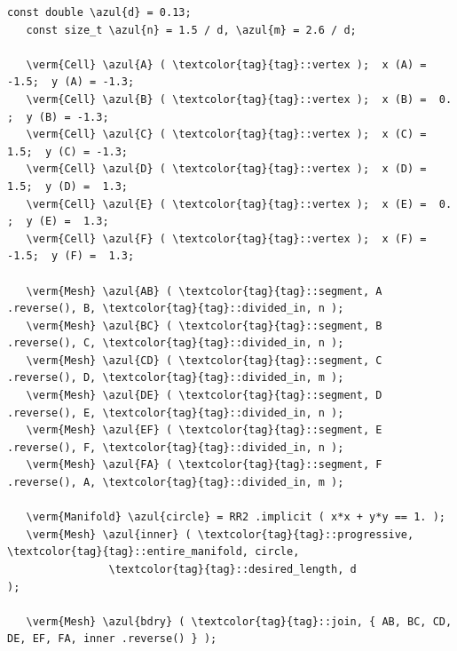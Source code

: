 \begin{Verbatim}[commandchars=\\\{\},formatcom=\small\tt,frame=single,
   label=parag-\ref{\numb section 7.\numb parag 18}.cpp,rulecolor=\color{coment},
   baselinestretch=0.94,framesep=2mm                                             ]
   const double \azul{d} = 0.13;
   const size_t \azul{n} = 1.5 / d, \azul{m} = 2.6 / d;

   \verm{Cell} \azul{A} ( \textcolor{tag}{tag}::vertex );  x (A) = -1.5;  y (A) = -1.3;
   \verm{Cell} \azul{B} ( \textcolor{tag}{tag}::vertex );  x (B) =  0. ;  y (B) = -1.3;
   \verm{Cell} \azul{C} ( \textcolor{tag}{tag}::vertex );  x (C) =  1.5;  y (C) = -1.3;
   \verm{Cell} \azul{D} ( \textcolor{tag}{tag}::vertex );  x (D) =  1.5;  y (D) =  1.3;
   \verm{Cell} \azul{E} ( \textcolor{tag}{tag}::vertex );  x (E) =  0. ;  y (E) =  1.3;
   \verm{Cell} \azul{F} ( \textcolor{tag}{tag}::vertex );  x (F) = -1.5;  y (F) =  1.3;

   \verm{Mesh} \azul{AB} ( \textcolor{tag}{tag}::segment, A .reverse(), B, \textcolor{tag}{tag}::divided_in, n );
   \verm{Mesh} \azul{BC} ( \textcolor{tag}{tag}::segment, B .reverse(), C, \textcolor{tag}{tag}::divided_in, n );
   \verm{Mesh} \azul{CD} ( \textcolor{tag}{tag}::segment, C .reverse(), D, \textcolor{tag}{tag}::divided_in, m );
   \verm{Mesh} \azul{DE} ( \textcolor{tag}{tag}::segment, D .reverse(), E, \textcolor{tag}{tag}::divided_in, n );
   \verm{Mesh} \azul{EF} ( \textcolor{tag}{tag}::segment, E .reverse(), F, \textcolor{tag}{tag}::divided_in, n );
   \verm{Mesh} \azul{FA} ( \textcolor{tag}{tag}::segment, F .reverse(), A, \textcolor{tag}{tag}::divided_in, m );

   \verm{Manifold} \azul{circle} = RR2 .implicit ( x*x + y*y == 1. );
   \verm{Mesh} \azul{inner} ( \textcolor{tag}{tag}::progressive, \textcolor{tag}{tag}::entire_manifold, circle,
                \textcolor{tag}{tag}::desired_length, d                         );

   \verm{Mesh} \azul{bdry} ( \textcolor{tag}{tag}::join, { AB, BC, CD, DE, EF, FA, inner .reverse() } );
\end{Verbatim}

